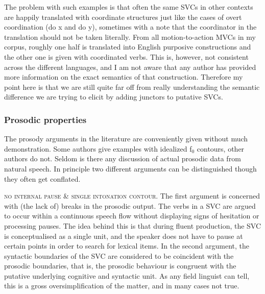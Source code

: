 The problem with such examples is that often the same SVCs in other contexts are happily translated with coordinate structures just like the cases of overt coordination (do x and do y), sometimes with a note that the coordinator in the translation should not be taken literally. From all motion-to-action MVCs in my corpus, roughly one half is translated into English purposive constructions and the other one is given with coordinated verbs. This is, however, not consistent across the different languages, and I am not aware that any author has provided more information on the exact semantics of that construction. Therefore my point here is that we are still quite far off from really understanding the semantic difference we are trying to elicit by adding junctors to putative SVCs. 

\subsubsection{Prosodic properties} \label{sec:prosodic}

The prosody arguments in the literature are conveniently given without much demonstration. Some authors give examples with idealized f$_0$ contours, other authors do not. Seldom is there any discussion of actual prosodic data from natural speech. In principle two different arguments can be distinguished though they often get conflated. 

\textsc{no internal pause} \& \textsc{single intonation contour}. The first argument is concerned with (the lack of) breaks in the prosodic output. The verbs in a SVC are argued to occur within a continuous speech flow without displaying signs of hesitation or processing pauses. The idea behind this is that during fluent production, the SVC is conceptualised as a single unit, and the speaker does not have to pause at certain points in order to search for lexical items. In the second argument, the syntactic boundaries of the SVC are considered to be coincident with the prosodic boundaries, that is, the prosodic behaviour is congruent with the putative underlying cognitive and syntactic unit. As any field linguist can tell, this is a gross oversimplification of the matter, and in many cases not true.


